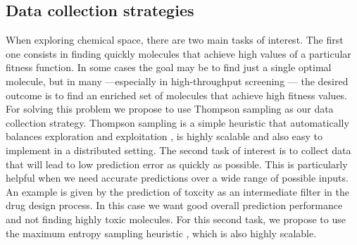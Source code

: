 \subsection{Data collection strategies}

When exploring chemical space, there are two main tasks of interest. The first one consists in finding quickly molecules that achieve high values of a particular fitness function. In some cases the goal may be to find just a single optimal molecule, but in many ---especially in high-throughput screening \cite{Pyzer_Knapp_2015a}--- the desired outcome is to find 
an enriched set of molecules that achieve high fitness values. For solving this problem we propose to use Thompson sampling \cite{Thompson_1933} as our data collection strategy. Thompson sampling is a simple heuristic that automatically balances exploration and exploitation \cite{Chapelle2011}, is highly scalable and also easy to implement in a distributed setting.
The second task of interest is to collect data that will lead to low prediction error as quickly as possible. This is particularly helpful when we need accurate predictions over a wide range of possible inputs. An example is given by the prediction of toxcity as an intermediate filter in the drug design process. In this case we want good overall prediction performance and not finding highly toxic molecules. For this second task, we propose to use the maximum entropy sampling heuristic \cite{MacKay_1992}, which is also highly scalable.